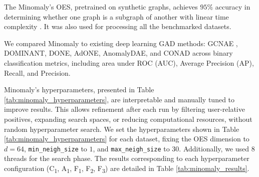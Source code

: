 \documentclass[pdflatex,sn-mathphys-num]{sn-jnl}%
\theoremstyle{thmstyleone}%
\theoremstyle{thmstyletwo}%
\theoremstyle{thmstylethree}%
\begin{document}
The Minomaly's OES, pretrained on synthetic graphs, achieves \(95\%\) accuracy in determining whether one graph is a subgraph of another with linear time complexity \cite{ying2024representation}. It was also used for processing all the benchmarked datasets.%

We compared Minomaly to existing deep learning GAD methods: GCNAE \cite{kipf2016variational,NEURIPS2022-acc1ec4a}, DOMINANT, DONE, AdONE, AnomalyDAE, and CONAD across binary classification metrics, including area under ROC (AUC), Average Precision (AP), Recall, and Precision.

Minomaly’s hyperparameters, presented in Table \ref{tab:minomaly_hyperparameters}, are interpretable and manually tuned to improve results. This allows refinement after each run by filtering user-relative positives, expanding search spaces, or reducing computational resources, without random hyperparameter search. We set the hyperparameters shown in Table \ref{tab:minomaly_hyperparameters} for each dataset, fixing the OES dimension to $d = 64$, \texttt{min\_neigh\_size} to $1$, and \texttt{max\_neigh\_size} to $30$. Additionally, we used $8$ threads for the search phase. The results corresponding to each hyperparameter configuration (C\textsubscript{1}, A\textsubscript{1}, F\textsubscript{1}, F\textsubscript{2}, F\textsubscript{3}) are detailed in Table \ref{tab:minomaly_results}.

\vspace*{-30pt}
\vspace*{-30pt}
\end{document}
